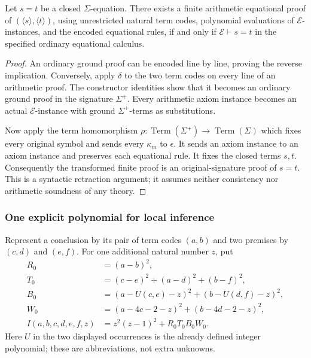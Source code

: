 \begin{auxsyntaxthm}
\label{thm:syntax-retraction}
Let $s=t$ be a closed $\Sigma$-equation.  There exists a finite arithmetic
equational proof of
$(\langle s\rangle,\langle t\rangle)$, using unrestricted natural term
codes, polynomial evaluations of $\mathcal E$-instances, and the encoded
equational rules, if and only if $\mathcal E\vdash s=t$ in the specified
ordinary equational calculus.
\end{auxsyntaxthm}
\begin{proof}
An ordinary ground proof can be encoded line by line, proving the
reverse implication.  Conversely, apply $\delta$ to the two term codes
on every line of an arithmetic proof.  The constructor identities show
that it becomes an ordinary ground proof in the signature $\Sigma^+$.
Every arithmetic axiom instance becomes an actual $\mathcal E$-instance
with ground $\Sigma^+$-terms as substitutions.

Now apply the term homomorphism
$\rho:\operatorname{Term}(\Sigma^+)\to\operatorname{Term}(\Sigma)$
which fixes every original symbol and sends every $\kappa_m$ to
$\epsilon$.  It sends an axiom instance to an axiom instance and
preserves each equational rule.  It fixes the closed terms $s,t$.
Consequently the transformed finite proof is an original-signature
proof of $s=t$.  This is a syntactic retraction argument; it assumes
neither consistency nor arithmetic soundness of any theory.
\end{proof}

\subsubsection*{One explicit polynomial for local inference}

Represent a conclusion by its pair of term codes $(a,b)$ and two premises
by $(c,d)$ and $(e,f)$.  For one additional natural number $z$, put
\begin{align}
 R_0&=(a-b)^2,\\
 T_0&=(c-e)^2+(a-d)^2+(b-f)^2,\\
 B_0&=(a-U(c,e)-z)^2+(b-U(d,f)-z)^2,\\
 W_0&=(a-4c-2-z)^2+(b-4d-2-z)^2,\\
 I(a,b,c,d,e,f,z)&=z^2(z-1)^2+R_0T_0B_0W_0.
 \label{eq:local-inference-poly}
\end{align}
Here $U$ in the two displayed occurrences is the already defined
integer polynomial; these are abbreviations, not extra unknowns.


